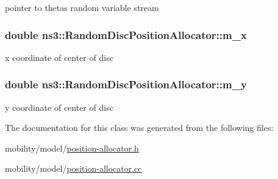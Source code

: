pointer to theta\textquotesingle{}s random variable stream 

\subsubsection[{\texorpdfstring{m\+\_\+x}{m_x}}]{\setlength{\rightskip}{0pt plus 5cm}double ns3\+::\+Random\+Disc\+Position\+Allocator\+::m\+\_\+x\hspace{0.3cm}{\ttfamily [private]}}\hypertarget{classns3_1_1RandomDiscPositionAllocator_a8642f8019a3621ad5e70347afeccd4f8}{}\label{classns3_1_1RandomDiscPositionAllocator_a8642f8019a3621ad5e70347afeccd4f8}


x coordinate of center of disc 

\subsubsection[{\texorpdfstring{m\+\_\+y}{m_y}}]{\setlength{\rightskip}{0pt plus 5cm}double ns3\+::\+Random\+Disc\+Position\+Allocator\+::m\+\_\+y\hspace{0.3cm}{\ttfamily [private]}}\hypertarget{classns3_1_1RandomDiscPositionAllocator_a2ad7aee755524f830dd1c86b9d793495}{}\label{classns3_1_1RandomDiscPositionAllocator_a2ad7aee755524f830dd1c86b9d793495}


y coordinate of center of disc 



The documentation for this class was generated from the following files\+:\begin{DoxyCompactItemize}
\item 
mobility/model/\hyperlink{position-allocator_8h}{position-\/allocator.\+h}\item 
mobility/model/\hyperlink{position-allocator_8cc}{position-\/allocator.\+cc}\end{DoxyCompactItemize}
